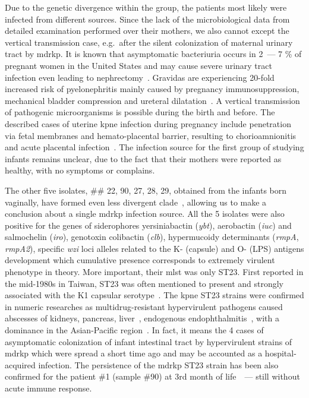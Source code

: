 Due to the genetic divergence within the group, the patients most likely were infected from different sources.
Since the lack of the microbiological data from detailed examination performed over their mothers, we also cannot except
the vertical transmission case, e.g.\ after the silent colonization of maternal urinary tract by \gls{mdrkp}.
It is known that asymptomatic bacteriuria occurs in 2~--- 7 \% of pregnant women in the United States
and may cause severe urinary tract infection even leading to nephrectomy~\cite{Kim2018}.
Gravidas are experiencing 20-fold increased risk of pyelonephritis mainly caused by pregnancy immunosuppression,
mechanical bladder compression and ureteral dilatation~\cite{Farkash2012}.
A vertical transmission of pathogenic microorganisms is possible during the birth and before.
The described cases of uterine \gls{kpne} infection during pregnancy include penetration via fetal membranes and
hemato-placental barrier, resulting to chorioamnionitis~\cite{Oh2017} and acute placental infection~\cite{Sheikh2005}.
The infection source for the first group of studying infants remains unclear, due to the fact that their mothers
were reported as healthy, with no symptoms or complains.

The other five isolates, \#\# 22, 90, 27, 28, 29, obtained from the infants born vaginally, have formed even less
divergent clade~, allowing us to make a conclusion about a single \gls{mdrkp} infection source.
All the 5 isolates were also positive for the genes of siderophores yersiniabactin (\textit{ybt}),
aerobactin (\textit{iuc}) and salmochelin (\textit{iro}), genotoxin colibactin (\textit{clb}),
hypermucoidy determinants (\textit{rmpA}, \textit{rmpA2}), specific \textit{wzi} loci alleles related to the
K- (capsule) and O- (LPS) antigens development which cumulative presence corresponds to extremely virulent phenotype
in theory.
More important, their \gls{mlst} was only ST23.
First reported in the mid-1980s in Taiwan, ST23 was often mentioned to present and strongly associated with the
K1 capsular serotype~\cite{Shon2013}.
The \gls{kpne} ST23 strains were confirmed in numeric researches as multidrug-resistant hypervirulent pathogens
caused abscesses of kidneys, pancreas, liver~\cite{Shen2019}, endogenous endophthalmitis~\cite{Xu2018},
with a dominance in the Asian-Pacific region~\cite{Thiry2019}.
In fact, it means the 4 cases of asymptomatic colonization of infant intestinal tract by hypervirulent strains of
\gls{mdrkp} which were spread a short time ago and may be accounted as a hospital-acquired infection.
The persistence of the \gls{mdrkp} ST23 strain has been also confirmed for the patient \#1 (sample \#90)
at 3rd month of life~~--- still without acute immune response.


